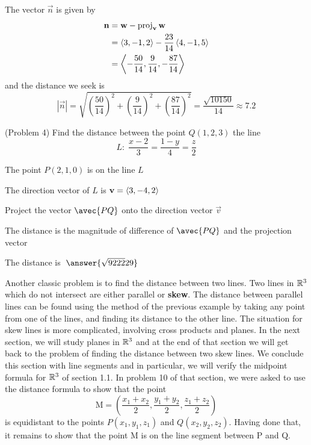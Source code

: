 \documentclass[handout]{ximera}
\begin{document}
\begin{example}[Example 4]
The vector $\vec{n}$ is given by
\begin{align*}
\mathbf{n} &= \mathbf{w} -  \operatorname{proj}_{\mathbf{v}} \mathbf{w}\\
&=\left\langle 3, -1, 2\right\rangle - \frac{23}{14}\left\langle 4,-1,5\right\rangle \\
&= \left\langle -\frac{50}{14},\frac{9}{14},-\frac{87}{14}\right\rangle
\end{align*}
and the distance we seek is
\[
|\vec{n}| = \sqrt{ \left(\frac{50}{14}\right)^2 +  \left(\frac{9}{14}\right)^2 + \left(\frac{87}{14}\right)^2} = \frac{\sqrt{10150}}{14}\approx 7.2
\]

\end{example}

\begin{problem}(Problem 4)
Find the distance between the point $Q(1, 2, 3)$ the line 
\[
L: \; \frac{x- 2}{3} = \frac{1-y}{4} = \frac{z}{2}
\]
\begin{hint}
The point $P(2, 1, 0)$ is on the line $L$
\end{hint}
\begin{hint}
The direction vector of $L$ is $\mathbf v = \left\langle 3, -4, 2\right\rangle$
\end{hint}
\begin{hint}
Project the vector $\avec{PQ}$ onto the direction vector $\vec v$
\end{hint}
\begin{hint}
The distance is the magnitude of difference of $\avec{PQ}$ and the projection vector
\end{hint}
The distance is $\; \answer{\sqrt{9222}{29}}$
\end{problem}

Another classic problem is to find the distance between two lines.
Two lines in $\mathbb R^3$ which do not intersect are either parallel or {\bf skew}.  
The distance between parallel lines can be found using the method of the previous example by 
taking any point from one of the lines,
and finding its distance to the other line.
The situation for skew lines is more complicated, involving cross products and planes.
In the next section, we will study planes in $\mathbb R^3$ and at the end of that section we will get back to the 
problem of finding the distance between two skew lines.
We conclude this section with line segments and in particular, we will verify the 
midpoint formula for $\mathbb R^3$ of section 1.1.  In problem 10 of that section, we were asked to use the distance formula to 
show that the point 
\[
\text{M} = \left(\frac{x_1 + x_2}{2}, \frac{y_1 + y_2}{2}, \frac{z_1 + z_2}{2}\right)
\]
is equidistant to the points $P(x_1, y_1, z_1)$ and $Q(x_2, y_2, z_2)$. 
Having done that, it remains to show that the point M is on the line segment between P and Q.
\end{document}
